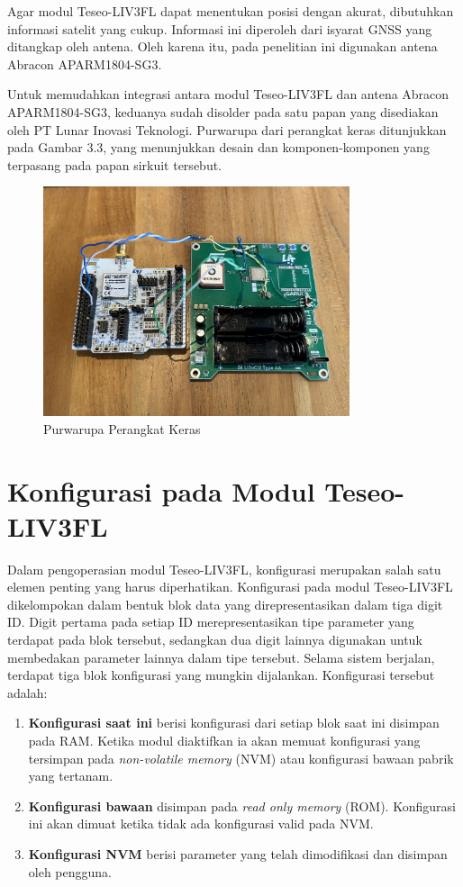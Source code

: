Agar modul Teseo-LIV3FL dapat menentukan posisi dengan akurat, dibutuhkan informasi satelit yang cukup. Informasi ini diperoleh dari isyarat GNSS yang ditangkap oleh antena. Oleh karena itu, pada penelitian ini digunakan antena Abracon APARM1804-SG3.

Untuk memudahkan integrasi antara modul Teseo-LIV3FL dan antena Abracon APARM1804-SG3, keduanya sudah disolder pada satu papan yang disediakan oleh PT Lunar Inovasi Teknologi. Purwarupa dari perangkat keras ditunjukkan pada Gambar 3.3, yang menunjukkan desain dan komponen-komponen yang terpasang pada papan sirkuit tersebut.


\begin{figure}[H]
	\centering
	\includegraphics[width=9cm]{contents/chapter-3/purwarupa.jpg}
	\caption{Purwarupa Perangkat Keras}
	\label{Fig: purwarupa-alat}
\end{figure}

\section{Konfigurasi pada Modul Teseo-LIV3FL}
Dalam pengoperasian modul Teseo-LIV3FL, konfigurasi merupakan salah satu elemen penting yang harus diperhatikan. Konfigurasi pada modul Teseo-LIV3FL dikelompokan dalam bentuk blok data yang direpresentasikan dalam tiga digit ID. Digit pertama pada setiap ID merepresentasikan tipe parameter yang terdapat pada blok tersebut, sedangkan dua digit lainnya digunakan untuk membedakan parameter lainnya dalam tipe tersebut. Selama sistem berjalan, terdapat tiga blok konfigurasi yang mungkin dijalankan. Konfigurasi tersebut adalah:

\begin{enumerate}
	\item \textbf{Konfigurasi saat ini} berisi konfigurasi dari setiap blok saat ini disimpan pada RAM. Ketika modul diaktifkan ia akan memuat konfigurasi yang tersimpan pada \textit{non-volatile memory} (NVM) atau konfigurasi bawaan pabrik yang tertanam.
	\item \textbf{Konfigurasi bawaan} disimpan pada \textit{read only memory} (ROM). Konfigurasi ini akan dimuat ketika tidak ada konfigurasi valid pada NVM.
	\item \textbf{Konfigurasi NVM} berisi parameter yang telah dimodifikasi dan disimpan oleh pengguna.
\end{enumerate}

